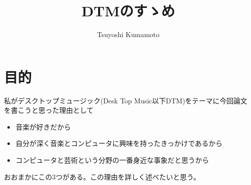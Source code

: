 \documentclass[ams]{U-AizuGT}
\author{Tsuyoshi Kumamoto}
\title{DTMのすゝめ}
\begin{document}
\maketitle

\section{目的}
私がデスクトップミュージック(Desk Top Music以下DTM)をテーマに今回論文を書こうと思った理由として\\
\begin{itemize}
\item 音楽が好きだから\\
\item 自分が深く音楽とコンピュータに興味を持ったきっかけであるから\\
\item コンピュータと芸術という分野の一番身近な事象だと思うから\\
\end{itemize}
おおまかにこの3つがある。この理由を詳しく述べたいと思う。\\
\end{document}
